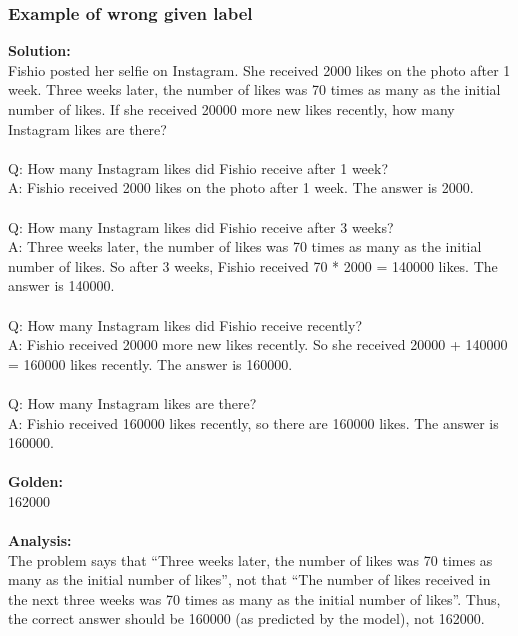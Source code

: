 \subsubsection{Example of wrong given label}

\textbf{Solution:} \\
Fishio posted her selfie on Instagram. She received 2000 likes on the photo after 1 week. Three weeks later, the number of likes was 70 times as many as the initial number of likes. If she received 20000 more new likes recently, how many Instagram likes are there? \\
 \\
Q: How many Instagram likes did Fishio receive after 1 week? \\
A: Fishio received 2000 likes on the photo after 1 week. The answer is 2000. \\
 \\
Q: How many Instagram likes did Fishio receive after 3 weeks? \\
A: Three weeks later, the number of likes was 70 times as many as the initial number of likes. So after 3 weeks, Fishio received 70 * 2000 = 140000 likes. The answer is 140000. \\
 \\
Q: How many Instagram likes did Fishio receive recently? \\
A: Fishio received 20000 more new likes recently. So she received 20000 + 140000 = 160000 likes recently. The answer is 160000. \\
 \\
Q: How many Instagram likes are there? \\
A: Fishio received 160000 likes recently, so there are 160000 likes. The answer is 160000. \\
 \\
\textbf{Golden:} \\
162000 \\
 \\
\textbf{Analysis:} \\
The problem says that ``Three weeks later, the number of likes was 70 times as many as the initial number of likes'', not that ``The number of likes received in the next three weeks was 70 times as many as the initial number of likes''. Thus, the correct answer should be 160000 (as predicted by the model), not 162000.
